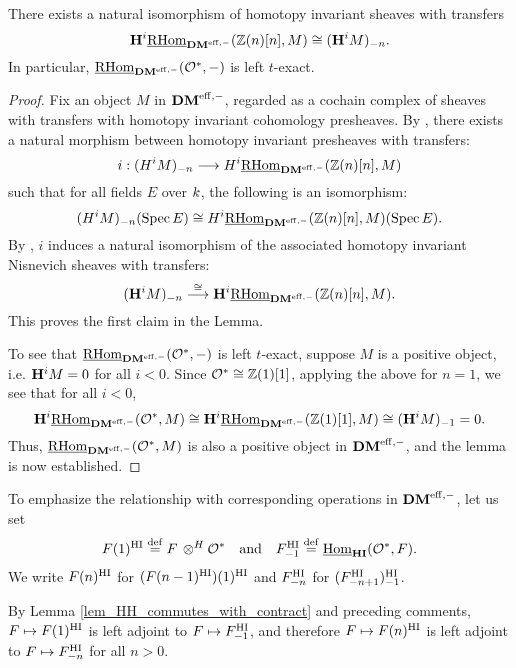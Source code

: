 \begin{lem}\label{lem_HH_commutes_with_contract}
There exists a natural isomorphism of homotopy invariant sheaves
with transfers
\[
\HH^i \ihomDMf(\Z(n)[n], M) \cong \RHI[n]{(\HH^i M)}.
\]
In particular, $\ihomDMf(\Ox, -)$ is left $t$-exact.
\end{lem}
\begin{proof}
Fix an object $M$ in $\DMeff$, regarded as a cochain complex of 
sheaves with transfers with homotopy invariant cohomology 
presheaves. By \cite[3.4.4]{DegGenMot}, there exists a natural
morphism between homotopy invariant presheaves with transfers:
\[
i : \RHI[n]{(H^i M)} \to H^i \ihomDMf(\Z(n)[n], M)
\] 
such that for all fields $E$ over $\basefield$, the following
is an isomorphism:
\[
\RHI[n]{(H^i M)}(\Spec E) \cong H^i\ihomDMf(\Z(n)[n], M)(\Spec E).
\]
By \cite[11.2]{MVW}, $i$ induces a natural isomorphism 
of the associated homotopy invariant Nisnevich sheaves with 
transfers:
\[
\RHI[n]{(\HH^i M)} \stackrel{\cong}{\to} \HH^i \ihomDMf(\Z(n)[n], 
   M).
\]
This proves the first claim in the Lemma. 

To see that $\ihomDMf(\Ox, -)$ is left $t$-exact, suppose $M$
is a positive object, i.e. $\HH^i M = 0$ for all $i < 0$. Since
$\Ox \cong \Z(1)[1]$, applying the above for $n = 1$, we see
that for all $i < 0$,
\[
\HH^i \ihomDMf(\Ox, M) \cong \HH^i \ihomDMf(\Z(1)[1], M) \cong 
   \RHI{(\HH^i M)} = 0.
\]
Thus, $\ihomDMf(\Ox, M)$ is also a positive object in $\DMeff$,
and the lemma is now established.
\end{proof}

\begin{defn}
To emphasize the relationship with corresponding operations in
$\DMeff$, let us set
\[
\LHIs{F} \defeq F \tHI \Ox \hspace{10pt} \textrm{and}\hspace{10pt} 
   \RHIs{F} \defeq \ihomHI(\Ox, F).
\]
We write $\LHIs[n]{F}$ for $\LHIs{(\LHIs[n - 1]{F})}$ and 
$\RHIs[n]{F}$ for $\RHIs{(\RHIs[n + 1]{F})}$. 
\end{defn}

By Lemma \ref{lem_HH_commutes_with_contract} and preceding 
comments, $F \mapsto \LHIs{F}$ is left adjoint to $F \mapsto 
\RHIs{F}$, and therefore $F \mapsto \LHIs[n]{F}$ is 
left adjoint to $F \mapsto \RHIs[n]{F}$ for all $n > 0$.

